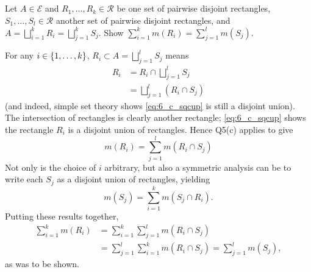 \documentclass[12pt]{article}
\begin{document}
\subsection{} 
Let $A \in \mathscr{E}$ and $R_1, \ldots, R_k \in \mathcal{R}$ be one set of pairwise disjoint rectangles, $S_1, \ldots, S_l \in \mathcal{R}$ another set of pairwise disjoint rectangles, and $A = \bigsqcup_{i = 1}^{k} R_i = \bigsqcup_{j = 1}^{k} S_j$. 
Show $\sum_{i = 1}^{k} m(R_i) = \sum_{j = 1}^{l} m(S_j)$. 

\noindent\dotfill 

For any $i \in \{1, \ldots, k\}$, $R_i \subset A = \bigsqcup_{j = 1}^{l} S_j$ means 
\begin{align}
  R_i & = R_i \cap \bigsqcup_{j = 1}^{l} S_j \nonumber \\ 
      & = \bigsqcup_{j = 1}^{l} (R_i \cap S_j) \label{eq:6_c_sqcup}
\end{align}
(and indeed, simple set theory shows \eqref{eq:6_c_sqcup} is still a disjoint union). 
The intersection of rectangles is clearly another rectangle; 
\eqref{eq:6_c_sqcup} shows the rectangle $R_i$ is a disjoint union of rectangles. 
Hence Q5(c) applies to give 
$$m(R_i) = \sum_{j = 1}^{l} m(R_i \cap S_j)$$
Not only is the choice of $i$ arbitrary, but also a symmetric analysis can be to write each $S_j$ as a disjoint union of rectangles, yielding 
$$m(S_j) = \sum_{i = 1}^{k} m(S_j \cap R_i).$$
Putting these results together,  
\begin{align*}
  \sum_{i = 1}^{k} m(R_i) & = \sum_{i = 1}^{k} \sum_{j = 1}^{l} m(R_i \cap S_j) \\ 
                          & = \sum_{j = 1}^{l} \sum_{i = 1}^{k} m(R_i \cap S_j) = \sum_{j = 1}^{l} m(S_j), 
\end{align*}
as was to be shown. 
\end{document}
